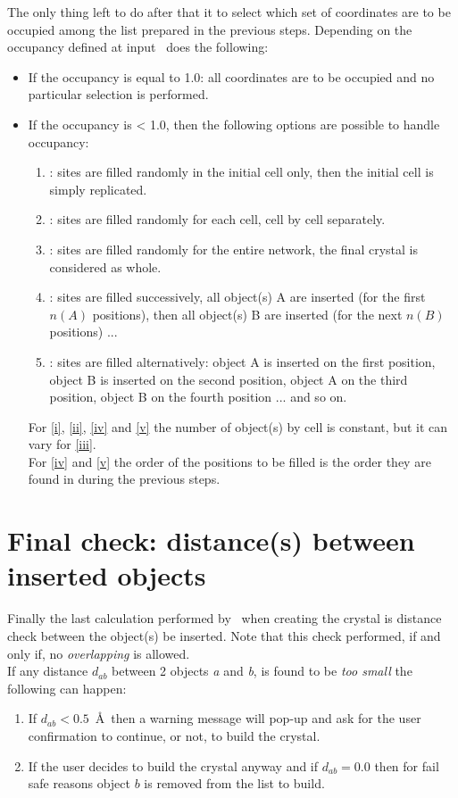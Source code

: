 The only thing left to do after that it to select which set of coordinates are to be occupied among the list prepared in the previous steps. 
Depending on the occupancy defined at input \atomes\ does the following:
\begin{itemize}
\item If the occupancy is equal to 1.0: all coordinates are to be occupied and no particular selection is performed. 
\item If the occupancy is < 1.0, then the following options are possible to handle occupancy: 
\begin{enumerate}
\item\label{i} : sites are filled randomly in the initial cell only, then the initial cell is simply replicated.
\item\label{ii} : sites are filled randomly for each cell, cell by cell separately.
\item\label{iii} : sites are filled randomly for the entire network, the final crystal is considered as whole.
\item\label{iv} : sites are filled successively, all object(s) A are inserted (for the first $n(A)$ positions), then all object(s) B are inserted (for the next $n(B)$ positions) ...  
\item\label{v} : sites are filled alternatively: object A is inserted on the first position, object B is inserted on the second position, object A on the third position, 
object B on the fourth position ... and so on.
\end{enumerate}
For \ref{i}, \ref{ii}, \ref{iv} and \ref{v} the number of object(s) by cell is constant, but it can vary for \ref{iii}. \\
For \ref{iv} and \ref{v} the order of the positions to be filled is the order they are found in during the previous steps. 
\end{itemize}

\section*{Final check: distance(s) between inserted objects}

Finally the last calculation performed by \atomes\ when creating the crystal is distance check between the object(s) be inserted. 
Note that this check performed, if and only if, no {\it{overlapping}} is allowed. \\
If any distance $d_{ab}$ between 2 objects {\it{a}} and {\it{b}}, is found to be {\it{too small}} the following can happen:
\begin{enumerate}
\item If $d_{ab} < 0.5$~\AA\ then a warning message will pop-up and ask for the user confirmation to continue, or not, to build the crystal. 
\item If the user decides to build the crystal anyway and if $d_{ab} = 0.0$ then for fail safe reasons object $b$ is removed from the list to build.
\end{enumerate}

